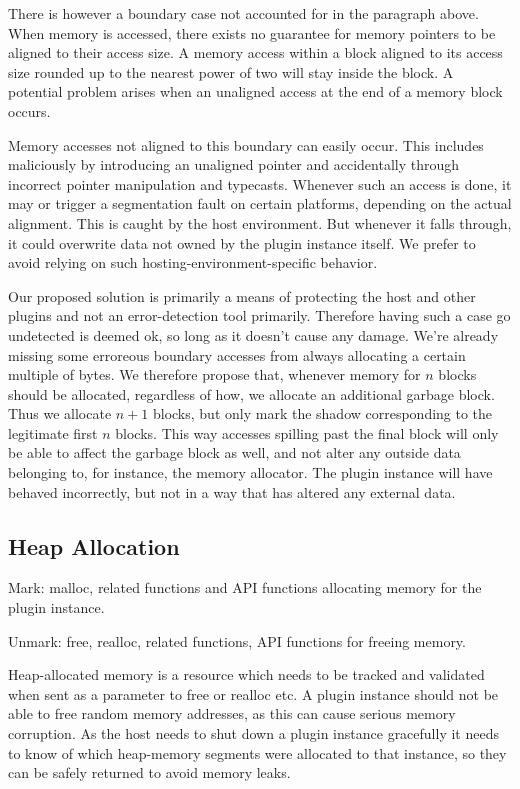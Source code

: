 There is however a boundary case not accounted for in the paragraph above. When
memory is accessed, there exists no guarantee for memory pointers to be aligned
to their access size. A memory access within a block aligned to its access size
rounded up to the nearest power of two will stay inside the block. A potential
problem arises when an unaligned access at the end of a memory block occurs.

Memory accesses not aligned to this boundary can easily occur. This includes
maliciously by introducing an unaligned pointer and accidentally through
incorrect pointer manipulation and typecasts. Whenever such an access is done,
it may or trigger a segmentation fault on certain platforms, depending on the
actual alignment. This is caught by the host environment. But whenever it falls
through, it could overwrite data not owned by the plugin instance itself. We
prefer to avoid relying on such hosting-environment-specific behavior.

Our proposed solution is primarily a means of protecting the host and other
plugins and not an error-detection tool primarily. Therefore having such a case
go undetected is deemed ok, so long as it doesn't cause any damage. We're
already missing some erroreous boundary accesses from always allocating a
certain multiple of bytes. We therefore propose that, whenever memory for $n$
blocks should be allocated, regardless of how, we allocate an additional garbage
block. Thus we allocate $n+1$ blocks, but only mark the shadow corresponding to
the legitimate first $n$ blocks. This way accesses spilling past the final
block will only be able to affect the garbage block as well, and not alter any
outside data belonging to, for instance, the memory allocator. The plugin
instance will have behaved incorrectly, but not in a way that has altered any
external data.

\subsection {Heap Allocation}

Mark: malloc, related functions and API functions allocating memory for the
plugin instance.

Unmark: free, realloc, related functions, API functions for freeing memory.

Heap-allocated memory is a resource which needs to be tracked and validated when
sent as a parameter to free or realloc etc. A plugin instance should not be able
to free random memory addresses, as this can cause serious memory corruption. As
the host needs to shut down a plugin instance gracefully it needs to know of
which heap-memory segments were allocated to that instance, so they can be
safely returned to avoid memory leaks.

